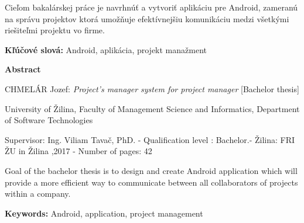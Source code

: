 Cieľom bakalárskej práce je navrhnúť a vytvoriť aplikáciu pre Android, zameranú na správu  projektov ktorá umožňuje efektívnejšiu komunikáciu medzi všetkými riešiteľmi projektu vo firme.

\vspace{1em}

\noindent
{\bf Kľúčové slová:} Android, aplikácia, projekt manažment

\pagebreak



\pagebreak

\begin{center}

\sc\Large\textbf{Abstract}
    
\end{center}

\noindent
{\sc CHMELÁR Jozef:} {\em Project's manager system for project manager
}
[Bachelor thesis] 

\noindent
University of Žilina,  
Faculty of Management Science and Informatics,  
Department of Software Technologies

\noindent  
Supervisor: Ing. Viliam Tavač, PhD.  - Qualification level : Bachelor.- Žilina: FRI ŽU in Žilina ,2017 - Number of pages: 42 


\vspace{1em}

Goal of the bachelor thesis is to design and create Android application which will provide a more efficient  way to communicate between all collaborators of projects within a company.

\vspace{1em}

\noindent
{\bf Keywords:} Android, application, project management

\pagebreak


